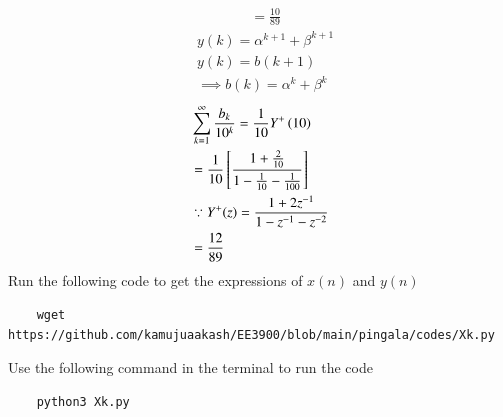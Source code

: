 \documentclass[journal,12pt,twocolumn]{IEEEtran}
\renewcommand\thesection{\arabic{section}}
\begin{document}
\begin{enumerate}[label=\thesection.\arabic*,ref=\thesection.\theenumi]
\begin{align}
	&=\frac{10}{89}
\end{align}
\begin{align}
	&y(k)=\alpha^{k+1}+\beta^{k+1}\\
	&y(k)=b(k+1)\\
	&\implies b(k)=\alpha^{k}+\beta^{k}
\end{align}
\begin{align}
	&\sum_{k=1}^{\infty}\frac{b_k}{10^k} =\frac{1}{10}Y^{+}\left({10}\right)\\
	&=\frac{1}{10}\left[\frac{1+\frac{2}{10}}{1-\frac{1}{10}-\frac{1}{100}}\right]\\
	&\because Y^{+}(z)=\frac{1+2z^{-1}}{1-z^{-1}-z^{-2}}\\
	&=\frac{12}{89}
\end{align}
Run the following code to get the expressions of $x(n)$ and $y(n)$
\begin{lstlisting}
	wget https://github.com/kamujuaakash/EE3900/blob/main/pingala/codes/Xk.py
\end{lstlisting}
Use the following command in the terminal to run the code
\begin{lstlisting}
	python3 Xk.py
\end{lstlisting}
\end{enumerate}
\end{document}
